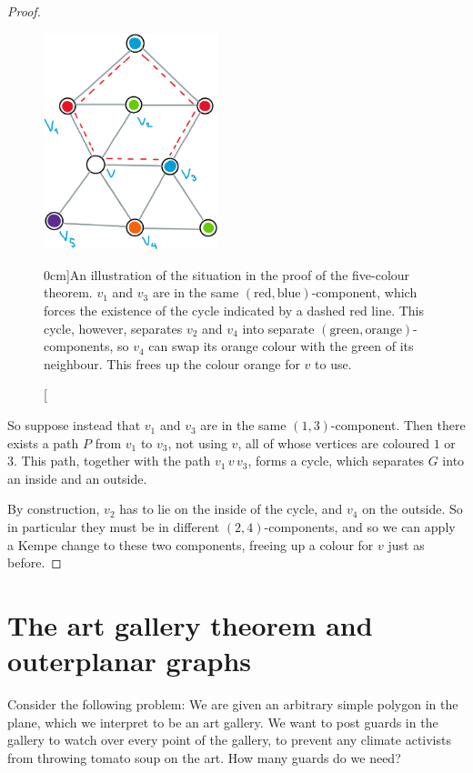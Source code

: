 \documentclass[nobib]{tufte-handout}
\begin{document}
\begin{theorem}
\begin{proof}
    \begin{figure}
      \centering
      \includegraphics[width=0.45\textwidth]{graphics/L12_colouring/planar_five_colour.png}
      \caption[][0cm]{An illustration of the situation in the proof of the five-colour theorem. $v_1$ and $v_3$ are in the same $(\text{red},\text{blue})$-component, which forces the existence of the cycle indicated by a dashed red line. This cycle, however, separates $v_2$ and $v_4$ into separate $(\text{green},\text{orange})$-components, so $v_4$ can swap its orange colour with the green of its neighbour. This frees up the colour orange for $v$ to use.}
      \label{fig:planar_five_colour}
    \end{figure}

    So suppose instead that $v_1$ and $v_3$ are in the same $(1,3)$-component. Then there exists a path $P$ from $v_1$ to $v_3$, not using $v$, all of whose vertices are coloured $1$ or $3$. This path, together with the path $v_1\, v\, v_3$, forms a cycle, which separates $G$ into an inside and an outside.

    By construction, $v_2$ has to lie on the inside of the cycle, and $v_4$ on the outside. So in particular they must be in different $(2,4)$-components, and so we can apply a Kempe change to these two components, freeing up a colour for $v$ just as before.
  \end{proof}
\end{theorem}

\section{The art gallery theorem and outerplanar graphs}

Consider the following problem: We are given an arbitrary simple polygon in the plane, which we interpret to be an art gallery. We want to post guards in the gallery to watch over every point of the gallery, to prevent any climate activists from throwing tomato soup on the art. How many guards do we need?
\end{document}
